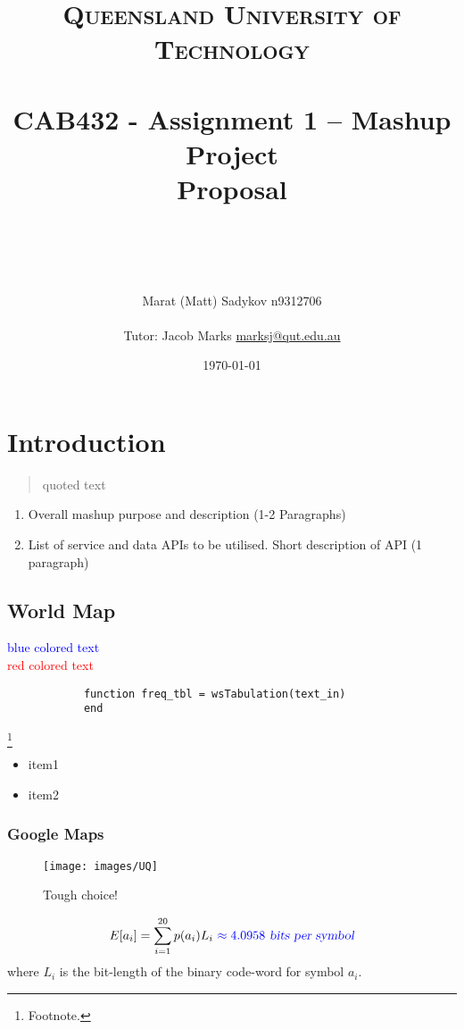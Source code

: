 \documentclass[12pt]{article}
\title{	
	\normalfont \normalsize 
	\textsc{Queensland University of Technology} \\ [25pt] 
	\horrule{0.5pt} \\[0.4cm] %
	\huge CAB432 - Assignment 1 – Mashup Project \\ Proposal \\ %
	\author{ Marat (Matt) Sadykov \small n9312706 \\ \\ Tutor: Jacob Marks \small \underline{marksj@qut.edu.au}}
	\date{\normalsize\today} %
	\horrule{2pt} \\[0.5cm] %
}
\numberwithin{equation}{section} %
\numberwithin{figure}{section} %
\numberwithin{table}{section} %
\begin{document}
\maketitle
\newpage
\tableofcontents
\newpage
\section{Introduction}	
	\begin{quote}
		quoted text
	\end{quote}\label{ref:100}

	\begin{enumerate}
		\item Overall mashup purpose and description (1-2 Paragraphs)
		\item List of service and data APIs to be utilised. Short description of API (1 paragraph)
	\end{enumerate} 

	\subsection{World Map}
		\textcolor{blue}{blue colored text}\\
		\textcolor{red}{red colored text}
	
		\begin{lstlisting}
			function freq_tbl = wsTabulation(text_in)	
			end
		\end{lstlisting}
		\footnote{Footnote.}
		
		\begin{itemize}
			\item[] item1
			\item[] item2
		\end{itemize}
	
		\subsubsection{Google Maps}
			\begin{figure}[H]
				\centering
				\caption{Tough choice!}
				\texttt{[image: images/UQ]}
			\end{figure}		
			$$E[a_i] = \sum\limits_{i=1}^{20} p(a_i)L_i \  \textcolor{blue}{\approx 4.0958 \textsl{ bits per symbol}}$$ where $L_i$ is the bit-length of the binary code-word for symbol $a_i$.
\end{document}
